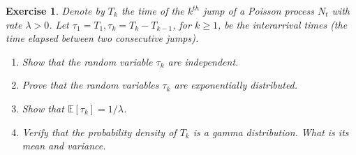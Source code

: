 \documentclass[12pt]{article}
\theoremstyle{colon}
\newtheorem{exercise}{Exercise}
\begin{document}
\clearpage

\begin{exercise}
  Denote by $T_k$ the time of the $k^{th}$ jump of a Poisson process $N_t$ with rate $\lambda > 0$. Let $\tau_1 = T_1, \tau_k = T_k - T_{k-1}$, for $k \geq 1$, be the interarrival times (the time elapsed between two consecutive jumps).
  \begin{enumerate}[label=\alph*)]
    \item Show that the random variable $\tau_k$ are independent.
    \item Prove that the random variables $\tau_k$ are exponentially distributed.
    \item Show that $\mathbb{E}[\tau_k] = 1/\lambda$.
    \item Verify that the probability density of $T_k$ is a gamma distribution. What is its mean and variance.
  \end{enumerate}
\end{exercise}
\end{document}
